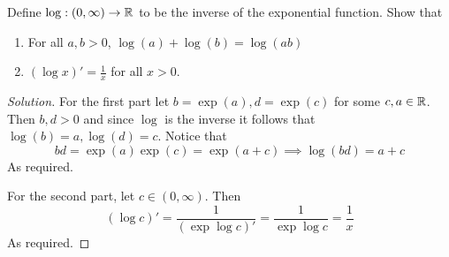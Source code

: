 \begin{exercise}
  Define $\log:(0,\infty)\to\mathbb R$ to be the inverse of the exponential function. Show that
  \begin{enumerate}
    \item For all $a,b>0$, $\log(a)+\log(b)=\log(ab)$
    \item $(\log x)'= \frac{1}{x}$ for all $x>0$.
  \end{enumerate}
\end{exercise}
\begin{proof}[Solution]
  For the first part let $b=\exp(a), d=\exp(c)$ for some $c,a\in\mathbb R$. Then $b,d>0$ and
  since $\log$ is the inverse it follows that $\log(b)=a, \log(d)=c$. Notice that 
  \[bd=\exp(a)\exp(c)=\exp(a+c) \implies \log(bd)=a+c\]
  As required.

  For the second part, let $c\in (0,\infty)$. Then
  \[(\log c)'=\frac{1}{(\exp\log c)'} = \frac{1}{\exp\log c} = \frac{1}{x}\]
  As required.
  
\end{proof}
